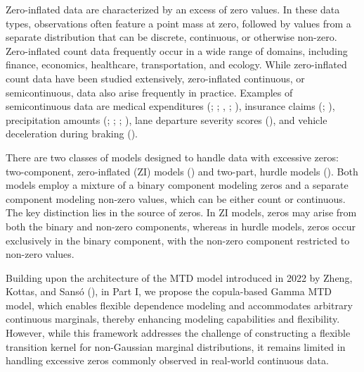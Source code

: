 \documentclass[
  letterpaper,
  double,
  12pt,
  1.0in]{beavtex}
\begin{document}
Zero-inflated data are characterized by an excess of zero values. In
these data types, observations often feature a point mass at zero,
followed by values from a separate distribution that can be discrete,
continuous, or otherwise non-zero. Zero-inflated count data frequently
occur in a wide range of domains, including finance, economics,
healthcare, transportation, and ecology. While zero-inflated count data
have been studied extensively, zero-inflated continuous, or
semicontinuous, data also arise frequently in practice. Examples of
semicontinuous data are medical expenditures
(;
;
,
;
), insurance claims
(;
), precipitation
amounts (; ;
;
), lane departure severity scores
(), and vehicle deceleration
during braking ().

There are two classes of models designed to handle data with excessive
zeros: two-component, zero-inflated (ZI) models
() and two-part, hurdle
models (). Both
models employ a mixture of a binary component modeling zeros and a
separate component modeling non-zero values, which can be either count
or continuous. The key distinction lies in the source of zeros. In ZI
models, zeros may arise from both the binary and non-zero components,
whereas in hurdle models, zeros occur exclusively in the binary
component, with the non-zero component restricted to non-zero values.

Building upon the architecture of the MTD model introduced in 2022 by
Zheng, Kottas, and Sansó (),
in Part I, we propose the copula-based Gamma MTD model, which enables
flexible dependence modeling and accommodates arbitrary continuous
marginals, thereby enhancing modeling capabilities and flexibility.
However, while this framework addresses the challenge of constructing a
flexible transition kernel for non-Gaussian marginal distributions, it
remains limited in handling excessive zeros commonly observed in
real-world continuous data.
\end{document}
